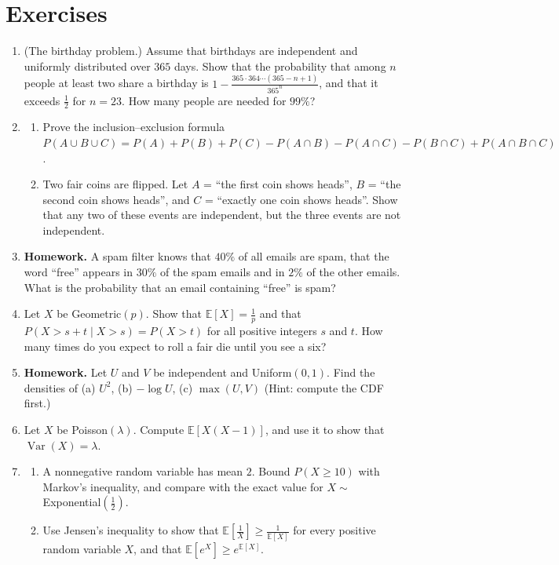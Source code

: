 \documentclass[11pt]{article}
\newcommand{\homework}{\textcolor{red!70!black}{\textbf{Homework.}}}
\newcommand{\E}{\mathbb{E}}
\DeclareMathOperator{\Var}{Var}
\theoremstyle{definition}
\theoremstyle{plain}
\theoremstyle{remark}
\begin{document}
\section{Exercises}\label{sec:exercises}
\begin{enumerate}[leftmargin=*]
    \item (The birthday problem.) Assume that birthdays are independent and uniformly distributed over $365$ days. Show that the probability that among $n$ people at least two share a birthday is $1 - \frac{365 \cdot 364 \cdots (365 - n + 1)}{365^n}$, and that it exceeds $\frac{1}{2}$ for $n = 23$. How many people are needed for $99\%$?
    \item \begin{enumerate}[label=(\alph*)]
        \item Prove the inclusion--exclusion formula $P(A \cup B \cup C) = P(A) + P(B) + P(C) - P(A \cap B) - P(A \cap C) - P(B \cap C) + P(A \cap B \cap C)$.
        \item Two fair coins are flipped. Let $A$ = ``the first coin shows heads'', $B$ = ``the second coin shows heads'', and $C$ = ``exactly one coin shows heads''. Show that any two of these events are independent, but the three events are not independent.
    \end{enumerate}
    \item \homework{} A spam filter knows that $40\%$ of all emails are spam, that the word ``free'' appears in $30\%$ of the spam emails and in $2\%$ of the other emails. What is the probability that an email containing ``free'' is spam?
    \item Let $X$ be Geometric$(p)$. Show that $\E[X] = \frac{1}{p}$ and that $P(X > s + t \mid X > s) = P(X > t)$ for all positive integers $s$ and $t$. How many times do you expect to roll a fair die until you see a six?
    \item \homework{} Let $U$ and $V$ be independent and Uniform$(0, 1)$. Find the densities of (a) $U^2$, (b) $-\log U$, (c) $\max(U, V)$ (Hint: compute the CDF first.)
    \item Let $X$ be Poisson$(\lambda)$. Compute $\E[X(X - 1)]$, and use it to show that $\Var(X) = \lambda$.
    \item \begin{enumerate}[label=(\alph*)]
        \item A nonnegative random variable has mean $2$. Bound $P(X \geq 10)$ with Markov's inequality, and compare with the exact value for $X \sim$ Exponential$(\frac{1}{2})$.
        \item Use Jensen's inequality to show that $\E[\frac{1}{X}] \geq \frac{1}{\E[X]}$ for every positive random variable $X$, and that $\E[e^X] \geq e^{\E[X]}$.

\end{enumerate}
\end{enumerate}
\end{document}

